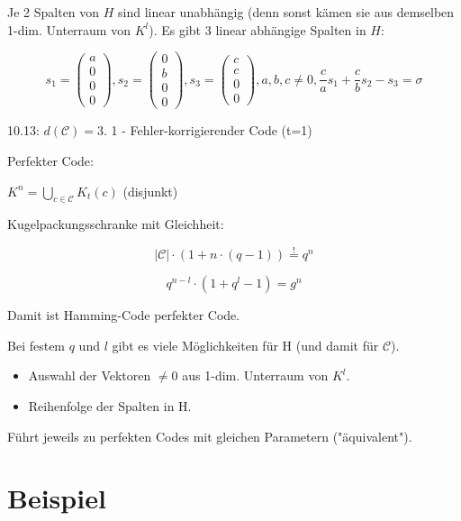 \documentclass[a4paper, openany]{book}
\begin{document}
Je 2 Spalten von $H$ sind linear unabhängig (denn sonst kämen sie aus demselben 1-dim. Unterraum von $K^l$). Es gibt 3 linear abhängige Spalten in $H$:

\[ s_1 = \begin{pmatrix}a \\ 0 \\ 0 \\ 0 \end{pmatrix}, s_2 = \begin{pmatrix}0 \\ b \\ 0 \\ 0 \end{pmatrix}, s_3 = \begin{pmatrix}c \\ c \\ 0 \\ 0 \end{pmatrix}, a,b,c \neq 0 , \frac{c}{a} s_1 + \frac{c}{b} s_2 - s_3 = \sigma\]

10.13: $d(\mathcal{C}) = 3$. 1 - Fehler-korrigierender Code (t=1)

\par \medskip

Perfekter Code:

$K^n = \bigcup_{c \in \mathcal{C}} K_t(c)$ (disjunkt)

\par \medskip

Kugelpackungsschranke mit Gleichheit:

\[|\mathcal{C}| \cdot (1 + n \cdot (q-1)) \overset{!}{=} q^n \]

\[ q^{n-l} \cdot (1 + q^l -1) = g^n \]

Damit ist Hamming-Code perfekter Code.

\par \medskip

Bei festem $q$ und $l$ gibt es viele Möglichkeiten für H (und damit für $\mathcal{C}$). 

\begin{itemize}
	\item Auswahl der Vektoren $\neq 0$ aus 1-dim. Unterraum von $K^l$.
	\item Reihenfolge der Spalten in H.
\end{itemize}

Führt jeweils zu perfekten Codes mit gleichen Parametern ("äquivalent").

\section{Beispiel}
\end{document}
